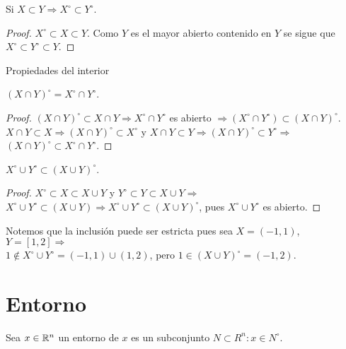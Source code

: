 \begin{corollary}
  Si $X \subset Y \Rightarrow X^{\circ} \subset Y^{\circ}$.
  \begin{proof}
    $X^{\circ} \subset X \subset Y$. Como $Y$ es el mayor abierto contenido en $Y$ se sigue que $X^{\circ} \subset Y^{\circ} \subset Y$. 
  \end{proof}
\end{corollary}

Propiedades del interior

\begin{prop}
  $(X \cap Y)^{\circ} = X^{\circ} \cap Y^{\circ}$.
  \begin{proof}
    $(X \cap Y)^{\circ} \subset X \cap Y \Rightarrow X^{\circ} \cap Y^{\circ}$ es abierto $\Rightarrow (X^{\circ} \cap Y^{\circ}) \subset (X \cap Y)^{\circ}$. \\
    $X \cap Y \subset X \Rightarrow (X \cap Y)^{\circ} \subset X^{\circ}$ y $X \cap Y \subset Y \Rightarrow (X \cap Y)^{\circ} \subset Y^{\circ} \Rightarrow$ \\
    $(X \cap Y)^{\circ} \subset X^{\circ} \cap Y^{\circ}$. 
  \end{proof}
\end{prop}

\begin{prop}
  $X^{\circ} \cup Y^{\circ} \subset (X \cup Y)^{\circ}$.
  \begin{proof}
    $X^{\circ} \subset X \subset X \cup Y$ y $Y^{\circ} \subset Y \subset X \cup Y \Rightarrow$ \\
    $X^{\circ} \cup Y^{\circ} \subset (X \cup Y) \Rightarrow X^{\circ} \cup Y^{\circ} \subset (X \cup Y)^{\circ}$, pues $X^{\circ} \cup Y^{\circ}$ es abierto. 
  \end{proof}
\end{prop}

Notemos que la inclusión puede ser estricta pues sea $X = (-1, 1)$, $Y = [1, 2] \Rightarrow$ \\
$1 \notin X^{\circ} \cup Y^{\circ} = (-1, 1) \cup (1, 2)$, pero $1 \in (X \cup Y)^{\circ} = (-1, 2)$.

\section{Entorno}

\begin{definition}[Entorno]
  Sea $x \in \mathbb{R}^n$ un entorno de $x$ es un subconjunto $N \subset R^n : x \in N^{\circ}$.
\end{definition}

